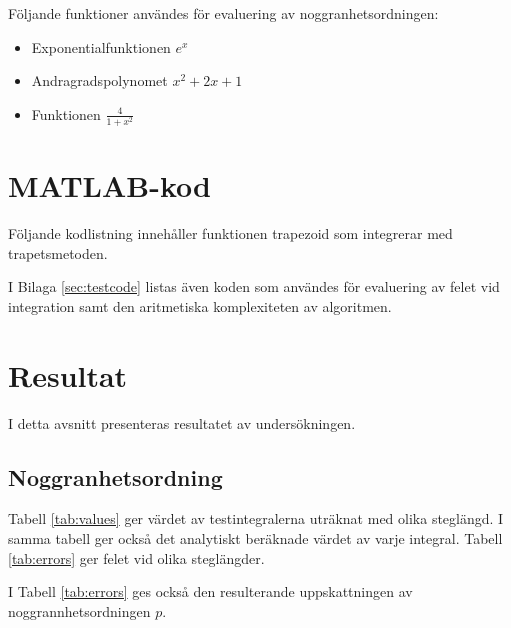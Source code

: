 \documentclass[a4paper,titlepage]{article}
\begin{document}
Följande funktioner användes för evaluering av noggranhetsordningen:

\begin{itemize}
    \item Exponentialfunktionen $e^x$
    \item Andragradspolynomet $x^2 + 2x + 1$
    \item Funktionen $\frac{4}{1 + x^2}$
\end{itemize}

\section{MATLAB-kod}

Följande kodlistning innehåller funktionen trapezoid som integrerar med trapetsmetoden.



I Bilaga \ref{sec:testcode} listas även koden som användes för evaluering av
felet vid integration samt den aritmetiska komplexiteten av algoritmen.



\section{Resultat}

I detta avsnitt presenteras resultatet av undersökningen.

\subsection{Noggranhetsordning}

Tabell \ref{tab:values}
ger värdet av testintegralerna uträknat med olika steglängd. I samma tabell ger också
det analytiskt beräknade värdet av varje integral. Tabell \ref{tab:errors}
ger felet vid olika steglängder.

I Tabell \ref{tab:errors} ges också den resulterande uppskattningen av noggrannhetsordningen
$p$.
\end{document}
